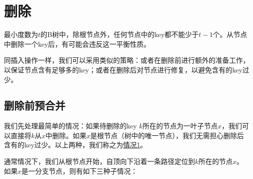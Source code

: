 \documentclass{ctexart}
\begin{document}
\section{删除}

最小度数为$t$的B树中，除根节点外，任何节点中的key都不能少于$t-1$个。从节点中删除一个key后，有可能会违反这一平衡性质。

同插入操作一样，我们可以采用类似的策略：或者在删除前进行额外的准备工作，以保证节点含有足够多的key；或者在删除后对节点进行修复，以避免含有的key过少。


\subsection{删除前预合并}

我们先处理最简单的情况：如果待删除的key $k$所在的节点为一叶子节点$x$，我们可以直接将$k$从$x$中删除。如果$x$是根节点（树中的唯一节点），我们无需担心删除后含有的key过少。以上两种，我们称之为\underline{情况1}。

通常情况下，我们从根节点开始，自顶向下沿着一条路径定位到$k$所在的节点$x$。如果$x$是一分支节点，则有如下三种子情况：
\end{document}
